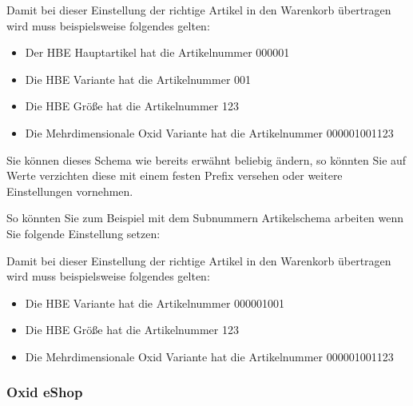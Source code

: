 \documentclass[letterpaper,10pt,ngerman]{sphinxmanual}
\begin{document}
Damit bei dieser Einstellung der richtige Artikel in den Warenkorb übertragen wird muss beispielsweise folgendes gelten:
\begin{itemize}
\item {} 
Der HBE Hauptartikel hat die Artikelnummer 000001

\item {} 
Die HBE Variante hat die Artikelnummer 001

\item {} 
Die HBE Größe hat die Artikelnummer 123

\item {} 
Die Mehrdimensionale Oxid Variante hat die Artikelnummer 000001\sphinxhyphen{}001\sphinxhyphen{}123

\end{itemize}

Sie können dieses Schema wie bereits erwähnt beliebig ändern, so könnten Sie auf Werte verzichten \sphinxhyphen{}
diese mit einem festen Prefix versehen oder weitere Einstellungen vornehmen.

So könnten Sie zum Beispiel mit dem Subnummern Artikelschema arbeiten wenn Sie folgende Einstellung setzen:

\begin{sphinxVerbatim}[commandchars=\\\{\}]
\end{sphinxVerbatim}

Damit bei dieser Einstellung der richtige Artikel in den Warenkorb übertragen wird muss beispielsweise folgendes gelten:
\begin{itemize}
\item {} 
Die HBE Variante hat die Artikelnummer 000001\sphinxhyphen{}001

\item {} 
Die HBE Größe hat die Artikelnummer 123

\item {} 
Die Mehrdimensionale Oxid Variante hat die Artikelnummer 000001\sphinxhyphen{}001\sphinxhyphen{}123

\end{itemize}


\subsubsection{Oxid eShop}
\label{\detokenize{modules/oxid/index:oxid-eshop}}\label{\detokenize{modules/oxid/index::doc}}
\end{document}

